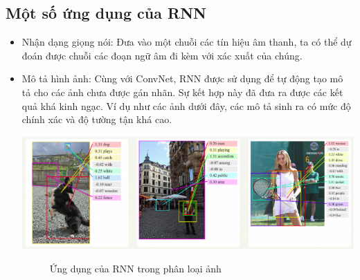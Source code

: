 \subsection{Một số ứng dụng của RNN}
\begin{itemize}
    \item Nhận dạng giọng nói: Đưa vào một chuỗi các tín hiệu âm thanh, ta có thể dự đoán được chuỗi các đoạn ngữ âm đi kèm với xác xuất của chúng.
    \item Mô tả hình ảnh: Cùng với ConvNet, RNN được sử dụng để tự động tạo mô tả cho các ảnh chưa được gán nhãn. Sự kết hợp này đã đưa ra được các kết quả khá kinh ngạc. Ví dụ như các ảnh dưới đây, các mô tả sinh ra có mức độ chính xác và độ tường tận khá cao.
    \begin{center}
    \includegraphics[scale=.4]{image/chapter6/RNN-application.png}
    \begin{figure}[htp]
    \begin{center}
    \end{center}
    \caption{Ứng dụng của RNN trong phân loại ảnh}
    \end{figure}
    \end{center}
\end{itemize}


